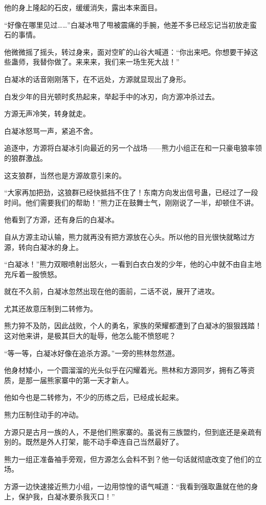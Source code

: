 \begin{this_body}
他的身上隆起的石皮，缓缓消失，露出本来面目。

“好像在哪里见过……”白凝冰甩了甩被震痛的手腕，他差不多已经忘记当初放走蛮石的事情。

他微微摇了摇头，转过身来，面对空旷的山谷大喊道：“你出来吧。你想要干掉这些蛊师，我替你做了。来来来，我们来一场生死大战！”

白凝冰的话音刚刚落下，在不远处，方源就显现出了身形。

白发少年的目光顿时炙热起来，举起手中的冰刃，向方源冲杀过去。

方源无声冷笑，转身就走。

白凝冰怒骂一声，紧追不舍。

追逐中，方源将白凝冰引向最近的另一个战场——熊力小组正在和一只豪电狼率领的狼群激战。

这支狼群，当然也是方源故意引来的。

“大家再加把劲，这狼群已经快抵挡不住了！东南方向发出信号蛊，已经过了一段时间。他们需要我们的帮助！”熊力正在鼓舞士气，刚刚说了一半，却顿住不讲。

他看到了方源，还有身后的白凝冰。

自从方源主动认输，熊力就再没有把方源放在心头。所以他的目光很快就略过方源，转向白凝冰的身上。

“白凝冰！”熊力双眼喷射出怒火，一看到白衣白发的少年，他的心中就不由自主地充斥着一股愤怒。

就在不久前，白凝冰忽然出现在他的面前，二话不说，展开了进攻。

尤其还故意压制到二转修为。

熊力猝不及防，因此战败，个人的勇名，家族的荣耀都遭到了白凝冰的狠狠践踏！这对他来讲，是极其巨大的耻辱，他怎么能不愤怒呢？

“等一等，白凝冰好像在追杀方源。”一旁的熊林忽然道。

他身材矮小，一个圆溜溜的光头似乎在闪耀着光。熊林和方源同岁，拥有乙等资质，是那一届熊家寨中的第一天才新人。

他如今也是二转修为，不少的历练之后，已经成长起来。

熊力压制住动手的冲动。

方源只是古月一族的人，不是他们熊家寨的。虽说有三族盟约，但到底还是亲疏有别的。既然是外人打架，能不动手牵连自己当然最好了。

熊力一组正准备袖手旁观，但方源怎么会料不到？他一句话就彻底改变了他们的立场。

方源一边快速接近熊力小组，一边用惊惶的语气喊道：“我看到强取蛊就在他的身上，保护我，白凝冰要杀我灭口！”

\end{this_body}

